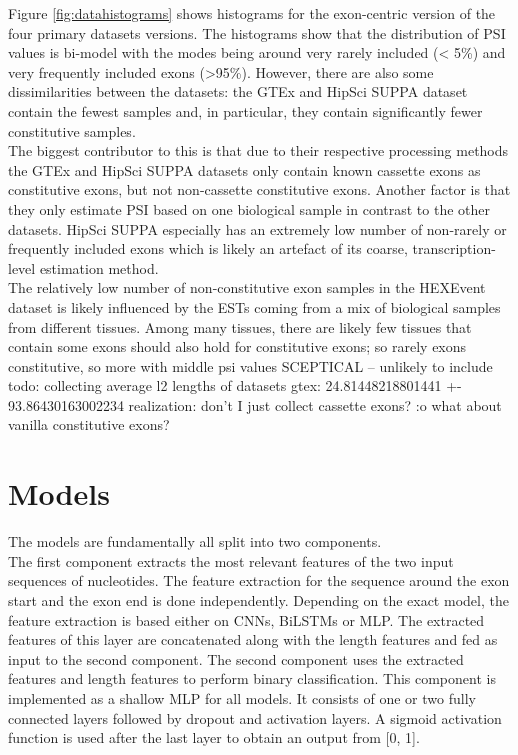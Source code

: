 Figure \ref{fig:datahistograms} shows histograms for the exon-centric version of the four primary datasets versions. The histograms show that the distribution of PSI values is bi-model with the modes being around very rarely included (< 5\%) and very frequently included exons (>95\%). However, there are also some dissimilarities between the datasets: the GTEx and HipSci SUPPA dataset contain the fewest samples and, in particular, they contain significantly fewer constitutive samples.\\
The biggest contributor to this is that due to their respective processing methods the GTEx and HipSci SUPPA datasets only contain known cassette exons as constitutive exons, but not non-cassette constitutive exons. Another factor is that they only estimate PSI based on one biological sample in contrast to the other datasets. HipSci SUPPA especially has an extremely low number of non-rarely or frequently included exons which is likely an artefact of its coarse, transcription-level estimation method.\\
The relatively low number of non-constitutive exon samples in the HEXEvent dataset is likely influenced by the ESTs coming from a mix of biological samples from different tissues. Among many tissues, there are likely few tissues that contain some exons
should also hold for constitutive exons; so rarely exons constitutive, so more with middle psi values
SCEPTICAL -- unlikely to include
todo:
collecting average l2 lengths of datasets
gtex: 24.81448218801441 +- 93.86430163002234
realization: don't I just collect cassette exons? :o what about vanilla constitutive exons?
\section{Models} \label{sec:models}
The models are fundamentally all split into two components. \\
The first component extracts the most relevant features of the two input sequences of nucleotides. The feature extraction for the sequence around the exon start and the exon end is done independently. Depending on the exact model, the feature extraction is based either on CNNs, BiLSTMs or MLP. The extracted features of this layer are concatenated along with the length features and fed as input to the second component.
The second component uses the extracted features and length features to perform binary classification. This component is implemented as a shallow MLP for all models. It consists of one or two fully connected layers followed by dropout and activation layers. A sigmoid activation function is used after the last layer to obtain an output from [0, 1].
